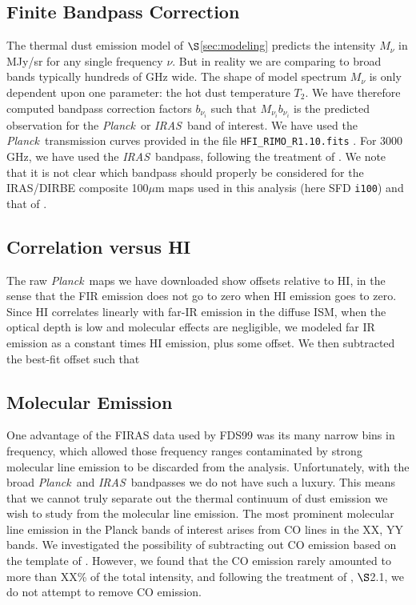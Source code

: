 \documentclass{emulateapj}
\newcommand{\IRAS}{{\it IRAS}}
\newcommand{\PLANCK}{{\it Planck}}
\begin{document}
\subsection{Finite Bandpass Correction}
The thermal dust emission model of $\S$\ref{sec:modeling} predicts the 
intensity $M_{\nu}$ in MJy/sr for any single frequency $\nu$. But in reality
we are comparing to broad bands typically hundreds of GHz wide. The shape of 
model spectrum $M_{\nu}$ is only dependent upon one parameter: the hot
dust temperature $T_2$. We have therefore computed bandpass correction factors
$b_{\nu_i}$ such that $M_{\nu_i}b_{\nu_i}$ is the predicted observation for the
\PLANCK~or \IRAS~band of interest. We have used the \PLANCK~transmission 
curves provided in the file \verb|HFI_RIMO_R1.10.fits| \citep{planckresponse}. 
For 3000 GHz, we have used the \IRAS~bandpass, following the treatment of
\cite{planckdust}. We note that it is not clear which bandpass should
properly be considered for the IRAS/DIRBE composite 100$\mu$m maps used in 
this analysis (here SFD \verb|i100|) and that of \cite{planckdust}.


\subsection{Correlation versus HI}
The raw \PLANCK~maps we have downloaded show offsets relative to HI, in the
sense that the FIR emission does not go to zero when HI emission goes to
zero. Since HI correlates linearly with far-IR emission in the diffuse ISM, 
when the optical depth is low and molecular effects are negligible, we modeled
far IR emission as a constant times HI emission, plus some offset. We then
subtracted the best-fit offset such that 

\subsection{Molecular Emission}
One advantage of the FIRAS data used by FDS99 was its many narrow bins in 
frequency, which allowed those frequency ranges contaminated by strong 
molecular line emission to be discarded from the analysis. Unfortunately, with 
the broad \PLANCK~and \IRAS~bandpasses we do not have such a luxury. This means
 that we cannot truly separate out the thermal continuum of dust emission we 
wish to study from the molecular line emission. The most prominent molecular 
line emission in the Planck bands of interest arises from CO lines in the XX, 
YY bands. We investigated the possibility of subtracting out CO emission based 
on the template of \cite{planckco}. However, we found that the CO emission
rarely amounted to more than XX\% of the total intensity, and following
the treatment of \cite{planckdust}, $\S$2.1, we do not attempt to remove CO
emission.
\end{document}
